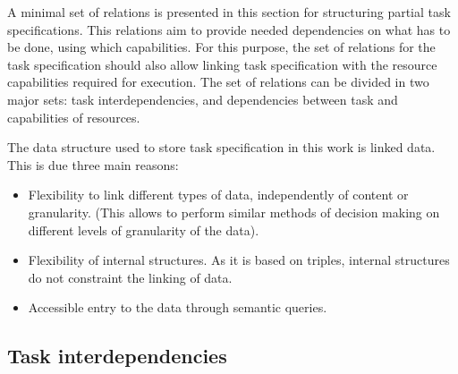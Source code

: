 \documentclass[a4paper,10pt]{article}
\begin{document}
A minimal set of relations is presented in this section for structuring partial task specifications.  This relations aim to provide needed dependencies on what has to be done, using which capabilities.
For this purpose, the set of relations for the task specification should also allow linking task specification with the resource capabilities required for execution.
The set of relations can be divided in two major sets: task interdependencies, and dependencies between task and capabilities of resources. %

The data structure used to store task specification in this work is linked data. This is due three main reasons:
\begin{itemize}
    \item Flexibility to link different types of data, independently of content or granularity. (This allows to perform similar methods of decision making on different levels of granularity of the data).
    \item Flexibility of internal structures. As it is based on triples, internal structures do not constraint the linking of data.
    \item Accessible entry to the data through semantic queries.
\end{itemize}
\subsection{Task interdependencies}
\end{document}
